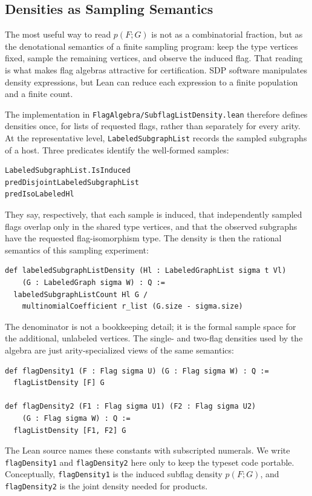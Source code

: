 \documentclass{article}
\newcommand{\lean}[1]{\texttt{#1}}
\begin{document}
\subsection{Densities as Sampling Semantics}

The most useful way to read $p(F;G)$ is not as a combinatorial fraction, but as
the denotational semantics of a finite sampling program: keep the type vertices
fixed, sample the remaining vertices, and observe the induced flag.  That
reading is what makes flag algebras attractive for certification.  SDP
software manipulates density expressions, but Lean can reduce each expression
to a finite population and a finite count.

The implementation in \lean{FlagAlgebra/SubflagListDensity.lean} therefore
defines densities once, for lists of requested flags, rather than separately
for every arity.  At the representative level, \lean{LabeledSubgraphList}
records the sampled subgraphs of a host.  Three predicates identify the
well-formed samples:
\begin{lstlisting}
LabeledSubgraphList.IsInduced
predDisjointLabeledSubgraphList
predIsoLabeledHl
\end{lstlisting}
They say, respectively, that each sample is induced, that independently
sampled flags overlap only in the shared type vertices, and that the observed
subgraphs have the requested flag-isomorphism type.  The density is then the
rational semantics of this sampling experiment:
\begin{lstlisting}
def labeledSubgraphListDensity (Hl : LabeledGraphList sigma t Vl)
    (G : LabeledGraph sigma W) : Q :=
  labeledSubgraphListCount Hl G /
    multinomialCoefficient r_list (G.size - sigma.size)
\end{lstlisting}
The denominator is not a bookkeeping detail; it is the formal sample space for
the additional, unlabeled vertices.  The single- and two-flag densities used by
the algebra are just arity-specialized views of the same semantics:
\begin{lstlisting}
def flagDensity1 (F : Flag sigma U) (G : Flag sigma W) : Q :=
  flagListDensity [F] G

def flagDensity2 (F1 : Flag sigma U1) (F2 : Flag sigma U2)
    (G : Flag sigma W) : Q :=
  flagListDensity [F1, F2] G
\end{lstlisting}
The Lean source names these constants with subscripted numerals.  We write
\lean{flagDensity1} and \lean{flagDensity2} here only to keep the typeset code
portable.  Conceptually, \lean{flagDensity1} is the induced subflag density
$p(F;G)$, and \lean{flagDensity2} is the joint density needed for products.
\end{document}
